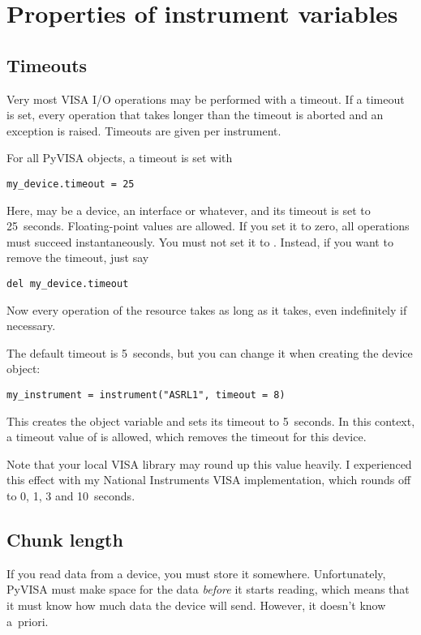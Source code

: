 \documentclass{howto}
\begin{document}
\section{Properties of instrument variables}


\subsection{Timeouts}
\label{sec:timeouts}

Very most VISA I/O operations may be performed with a timeout.  If a timeout is
set, every operation that takes longer than the timeout is aborted and an
exception is raised.  Timeouts are given per instrument.

For all PyVISA objects, a timeout is set with
\begin{verbatim}
my_device.timeout = 25
\end{verbatim}
Here,  may be a device, an interface or whatever, and its
timeout is set to 25~seconds.  Floating-point values are allowed.  If you set
it to zero, all operations must succeed instantaneously.  You must not set it
to .  Instead, if you want to remove the timeout, just say
\begin{verbatim}
del my_device.timeout
\end{verbatim}
Now every operation of the resource takes as long as it takes, even
indefinitely if necessary.

The default timeout is 5~seconds, but you can change it when creating the
device object:
\begin{verbatim}
my_instrument = instrument("ASRL1", timeout = 8)
\end{verbatim}
This creates the object variable  and sets its timeout to
5~seconds.  In this context, a timeout value of  is allowed, which
removes the timeout for this device.

Note that your local VISA library may round up this value heavily.  I
experienced this effect with my National Instruments VISA implementation, which
rounds off to 0, 1, 3 and 10~seconds.


\subsection{Chunk length}
\label{sec:chunk-length}

If you read data from a device, you must store it somewhere.  Unfortunately,
PyVISA must make space for the data \emph{before} it starts reading, which
means that it must know how much data the device will send.  However, it
doesn't know a~priori.
\end{document}
